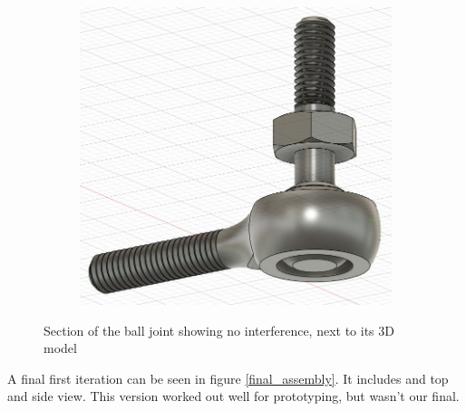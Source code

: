 \documentclass[a4paper, 10pt]{article}
\begin{document}
\begin{figure}[h]
\begin{subfigure}[h]{0.65\textwidth}
				\includegraphics[width=\textwidth]{Photos/ball_joint}
			\end{subfigure}
			\centering
			\caption{Section of the ball joint showing no interference, next to its 3D model}
			\label{ball_joint}
		\end{figure}
		
		A final first iteration can be seen in figure \ref{final_assembly}. It includes and top and side view. This version worked out well for prototyping, but wasn't our final.
		
\end{document}
